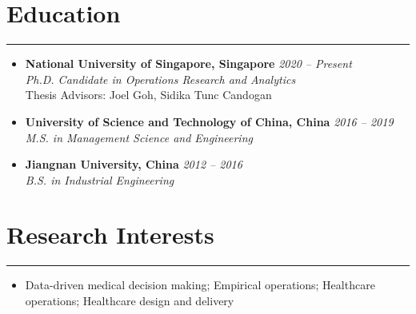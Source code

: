 \documentclass[12pt, a4paper]{article}
\begin{document}
{\small

\section*{Education}
\vspace*{0.4em}
\hrule height 0.4pt
\begin{itemize}[leftmargin=0pt, itemsep=6pt, parsep=0.2pt, topsep=1pt]

	\item[]
	\textbf{National University of Singapore, Singapore} \hfill \textit{2020 -- Present} \\
	\textit{Ph.D. Candidate in Operations Research and Analytics} \\
	Thesis Advisors: Joel Goh, Sidika Tunc Candogan

	\item[]
	\textbf{University of Science and Technology of China, China} \hfill \textit{2016 -- 2019} \\
	\textit{M.S. in Management Science and Engineering}

	\item[]
	\textbf{Jiangnan University, China} \hfill \textit{2012 -- 2016} \\
	\textit{B.S. in Industrial Engineering}

\end{itemize}




\section*{Research Interests}
\vspace*{0.4em}
\hrule height 0.5pt
\begin{itemize}[leftmargin=2pt, itemsep=6pt, parsep=0.2pt, topsep=1pt]

	\item[] Data-driven medical decision making; Empirical operations; Healthcare operations;  Healthcare design and delivery
	
\end{itemize}



}
\end{document}
